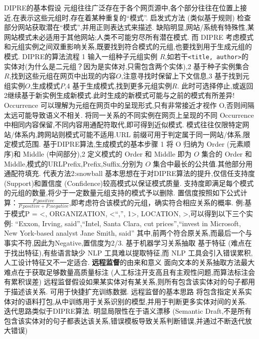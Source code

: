 \documentclass[10pt, utf8]{ctexart}
\begin{document}
\begin{multicols}{4}
    {\color{blue}DIPRE的基本假设}
    元组往往广泛存在于各个网页源中,各个部分往往在位置上接近,在表示这些元组时,存在着某种重复的“模式”.
    {\color{blue}启发式方法 (类似基于规则)}
    检查部分网站获取潜在“模式”,并用正则表达式来描述.
    缺陷明显,网站/系统有特殊性,某网站模式未必适用于其他网站;人类不可能穷尽所有潜在模式.
    而 DIPRE 考虑模式和元组实例之间双重影响关系,既要找到符合模式的元组,也要找到用于生成元组的模式.
    {\color{blue}DIPRE的算法流程}
    1 输入一组种子元组实例 $R$,如若干\verb|<title, author>|的实体对(为什么是二元组？因为是实体对,只需包含两个实体),2 基于种子实例集合 $R$,找到这些元组在网页中出现的内容$O$,注意寻找时保留上下文信息,3 基于找到元组实例$O$,生成模式$P$,4 基于生成模式,找到更多元组实例$R$.
    此时可选择停止,或返回2继续基于新实例生成新模式.此时生成的新模式可能与之前的模式有所差异!
    Occurrence 可以理解为元组在网页中的呈现形式,只有非常接近才视作 O,否则间隔太远可能导致语义不相关.
    将同一关系的不同实例在网页上呈现的不同 Occurrence 中相同内容保留,不同内容用通配符取代,即可得到近似模式.
    模式往往仅限特定网站/体系内,跨网站则模式可能不适用.URL 前缀可用于判定属于同一网站/体系,限定模式范围.
    {\color{blue}基于DIPRE算法,生成模式的基本步骤}
    1 将 O 归纳为 Order (元素顺序)和 Middle (中间部分),2 定义模式的 Order 和 Middle 即为 $O$ 集合的 Order 和 Middle,模式的URLPrefix,Prefix,Suffix,分别为 $O$ 集合中最长的公共值.其他部分用通配符填充.
    {\color{blue}代表方法2:snowball}
    基本思想在于对DIPRE算法的提升,仅信任支持度 (Support)和置信度 (Confidence)较高模式以保证模式质量.
    支持度即满足每个模式的元组的数量,将少于一定数量元组支持的模式予以删除.
    置信度按照如下公式计算：$\frac{P.positive}{P.positive+P.negative}$,即考虑符合该模式的元组，确实符合相应关系的概率.
    例:基于模式P = <{}, ORGANIZATION, <“,”, 1>, LOCATION, {}>,可以得到以下三个实例:
    “Exxon, Irving, said”,“Intel, Santa Clara, cut prices”,“invest in Microsoft, New York-based analyst Jane Smith, said”
    其中,前两个符合原关系,而最后一个与事实不符,因此为Negative,置信度为2/3.
    {\color{blue}基于机器学习关系抽取}
    基于特征 (难点在于找出特征),有些语言缺少 NLP 工具难以提取特征,而 NLP 工具会引入错误累积,人工设计特征又不一定适合.
    {\color{purple_}\textbf{远程监督}\color{blue}的由来和意义}
    面向文本的关系抽取方法最大难点在于获取足够数量高质量标注 (人工标注开支高且有主观性问题,而算法标注会有累积误差)
    远程监督假设如果某实体对有某关系,则所有包含该实体对的句子都用于描述该关系.
    可用于快捷扩充训练数据.
    {\color{blue}远程监督的基本思路}
    将包含指定关系实体对的语料打包,从中训练用于关系识别的模型,并用于判断更多实体对间的关系.
    迭代思路类似于DIPRE算法.
    明显局限性在于语义漂移 (Semantic Draft,不是所有包含该实体对的句子都表达该关系,错误模板导致关系判断错误,并通过不断迭代放大错误)

\end{multicols}
\end{document}
